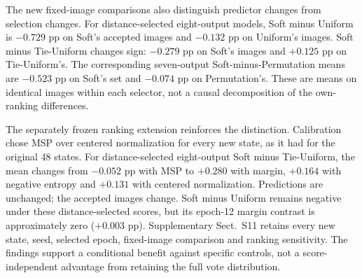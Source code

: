 The new fixed-image comparisons also distinguish predictor changes from selection changes. For distance-selected eight-output models, Soft minus Uniform is $-0.729$ pp on Soft's accepted images and $-0.132$ pp on Uniform's images. Soft minus Tie-Uniform changes sign: $-0.279$ pp on Soft's images and $+0.125$ pp on Tie-Uniform's. The corresponding seven-output Soft-minus-Permutation means are $-0.523$ pp on Soft's set and $-0.074$ pp on Permutation's. These are means on identical images within each selector, not a causal decomposition of the own-ranking differences.

The separately frozen ranking extension reinforces the distinction. Calibration chose MSP over centered normalization for every new state, as it had for the original 48 states. For distance-selected eight-output Soft minus Tie-Uniform, the mean changes from $-0.052$ pp with MSP to $+0.280$ with margin, $+0.164$ with negative entropy and $+0.131$ with centered normalization. Predictions are unchanged; the accepted images change. Soft minus Uniform remains negative under these distance-selected scores, but its epoch-12 margin contrast is approximately zero ($+0.003$ pp). Supplementary Sect.~S11 retains every new state, seed, selected epoch, fixed-image comparison and ranking sensitivity. The findings support a conditional benefit against specific controls, not a score-independent advantage from retaining the full vote distribution.
